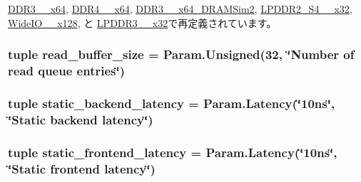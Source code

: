 \hyperlink{classDRAMCtrl_1_1DDR3__1600__x64_ab610af52b1f27db17e9de304176a80a8}{DDR3\_\_\-x64}, \hyperlink{classDRAMCtrl_1_1DDR4__2400__x64_ab610af52b1f27db17e9de304176a80a8}{DDR4\_\_\-x64}, \hyperlink{classDRAMCtrl_1_1DDR3__1333__x64__DRAMSim2_ab610af52b1f27db17e9de304176a80a8}{DDR3\_\_\-x64\_\-DRAMSim2}, \hyperlink{classDRAMCtrl_1_1LPDDR2__S4__1066__x32_ab610af52b1f27db17e9de304176a80a8}{LPDDR2\_\-S4\_\_\-x32}, \hyperlink{classDRAMCtrl_1_1WideIO__200__x128_ab610af52b1f27db17e9de304176a80a8}{WideIO\_\_\-x128}, と \hyperlink{classDRAMCtrl_1_1LPDDR3__1600__x32_ab610af52b1f27db17e9de304176a80a8}{LPDDR3\_\_\-x32}で再定義されています。\hypertarget{classDRAMCtrl_1_1DRAMCtrl_a5565530152f22fcf573df39bc15f2cbb}{
\subsubsection[{read\_\-buffer\_\-size}]{\setlength{\rightskip}{0pt plus 5cm}tuple {\bf read\_\-buffer\_\-size} = Param.Unsigned(32, \char`\"{}Number of read queue entries\char`\"{})}}
\label{classDRAMCtrl_1_1DRAMCtrl_a5565530152f22fcf573df39bc15f2cbb}
\hypertarget{classDRAMCtrl_1_1DRAMCtrl_a595c9b794d86d2ca9ca2bc28a8be9adf}{
\subsubsection[{static\_\-backend\_\-latency}]{\setlength{\rightskip}{0pt plus 5cm}tuple {\bf static\_\-backend\_\-latency} = Param.Latency(\char`\"{}10ns\char`\"{}, \char`\"{}Static backend latency\char`\"{})}}
\label{classDRAMCtrl_1_1DRAMCtrl_a595c9b794d86d2ca9ca2bc28a8be9adf}
\hypertarget{classDRAMCtrl_1_1DRAMCtrl_a37607d1e67471a6c3fdd8746152f911a}{
\subsubsection[{static\_\-frontend\_\-latency}]{\setlength{\rightskip}{0pt plus 5cm}tuple {\bf static\_\-frontend\_\-latency} = Param.Latency(\char`\"{}10ns\char`\"{}, \char`\"{}Static frontend latency\char`\"{})}}
